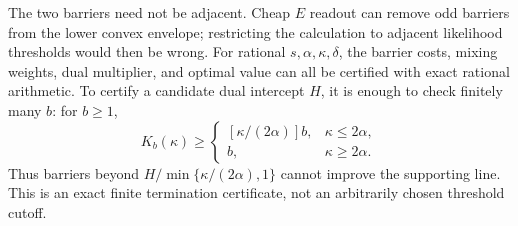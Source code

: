 The two barriers need not be adjacent. Cheap $E$ readout can remove odd
barriers from the lower convex envelope; restricting the calculation
to adjacent likelihood thresholds would then be wrong.
For rational $s,\alpha,\kappa,\delta$, the barrier costs, mixing weights,
dual multiplier, and optimal value can all be certified with exact
rational arithmetic. To certify a candidate dual intercept $H$, it is
enough to check finitely many $b$: for $b\geq1$,
\begin{equation}\label{eq:barrier-tail-cutoff}
 K_b(\kappa)\geq
 \begin{cases}[\kappa/(2\alpha)]b,&\kappa\leq2\alpha,\\ b,&\kappa\geq2\alpha.
 \end{cases}
\end{equation}
Thus barriers beyond $H/\min\{\kappa/(2\alpha),1\}$ cannot improve the
supporting line. This is an exact finite termination certificate,
not an arbitrarily chosen threshold cutoff.


